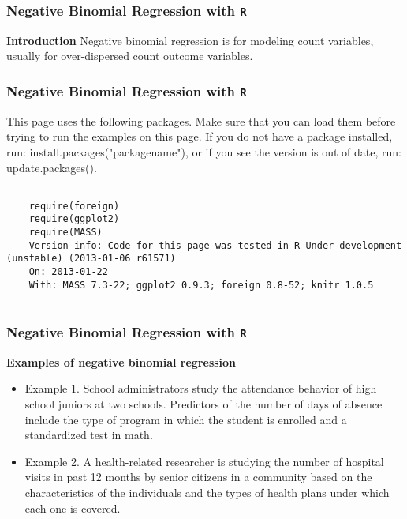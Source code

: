 \documentclass[00-GLMregslides.tex]{subfiles}
\begin{document}
	

\begin{frame}[fragile]
\frametitle{Negative Binomial Regression with \texttt{R} }
\Large

\textbf{Introduction}
Negative binomial regression is for modeling count variables, usually for over-dispersed count outcome variables.

\end{frame}
\begin{frame}[fragile]
	\frametitle{Negative Binomial Regression with \texttt{R} }
	\Large
This page uses the following packages. Make sure that you can load them before trying to run the examples on this page. If you do not have a package installed, run: install.packages("packagename"), or if you see the version is out of date, run: update.packages().

\begin{framed}
	\begin{verbatim}
	
	require(foreign)
	require(ggplot2)
	require(MASS)
	Version info: Code for this page was tested in R Under development (unstable) (2013-01-06 r61571)
	On: 2013-01-22
	With: MASS 7.3-22; ggplot2 0.9.3; foreign 0.8-52; knitr 1.0.5
		
	\end{verbatim}	
\end{framed}


	
\end{frame}
\begin{frame}[fragile]
	\frametitle{Negative Binomial Regression with \texttt{R} }
	\Large
	
\textbf{Examples of negative binomial regression}
\begin{itemize}
\item Example 1. School administrators study the attendance behavior of high school juniors at two schools. Predictors of the number of days of absence include the type of program in which the student is enrolled and a standardized test in math.

\item Example 2. A health-related researcher is studying the number of hospital visits in past 12 months by senior citizens in a community based on the characteristics of the individuals and the types of health plans under which each one is covered.
\end{itemize}
\end{frame}
\end{document}
